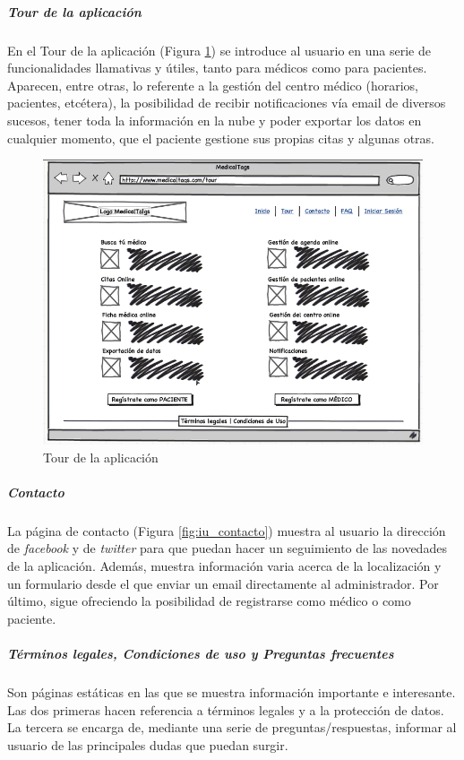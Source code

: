 		\subparagraph{Tour de la aplicación} %
		\label{par:iu_tour_de_la_aplicacion}
		
		En el Tour de la aplicación (Figura \ref{fig:iu_tour}) se introduce al usuario en  una serie de funcionalidades llamativas y útiles, tanto para médicos como para pacientes. Aparecen, entre otras, lo referente a la gestión del centro médico (horarios, pacientes, etcétera), la posibilidad de recibir notificaciones vía email de diversos sucesos, tener toda la información en la nube y poder exportar los datos en cualquier momento, que el paciente gestione sus propias citas y algunas otras.
		
			\begin{figure}[H]
			  \centering
			    \includegraphics[width=12cm]{img/png/interfaz/4_Tour.png}
			  \caption{Tour de la aplicación}
			  \label{fig:iu_tour}
			\end{figure}
			
		
		\subparagraph{Contacto} %
		\label{par:contacto}
			La página de contacto (Figura \ref{fig:iu_contacto}) muestra al usuario la dirección de \textit{facebook} y de \textit{twitter} para que puedan hacer un seguimiento de las novedades de la aplicación. Además, muestra información varia acerca de la localización y un formulario desde el que enviar un email directamente al administrador. Por último, sigue ofreciendo la posibilidad de registrarse como médico o como paciente.
		
		\subparagraph{Términos legales, Condiciones de uso y Preguntas frecuentes} %
		\label{par:terminos_legales_y_condiciones_de_uso}
			Son páginas estáticas en las que se muestra información importante e interesante. Las dos primeras hacen referencia a términos legales y a la protección de datos. La tercera se encarga de, mediante una serie de preguntas/respuestas, informar al usuario de las principales dudas que puedan surgir.
		

